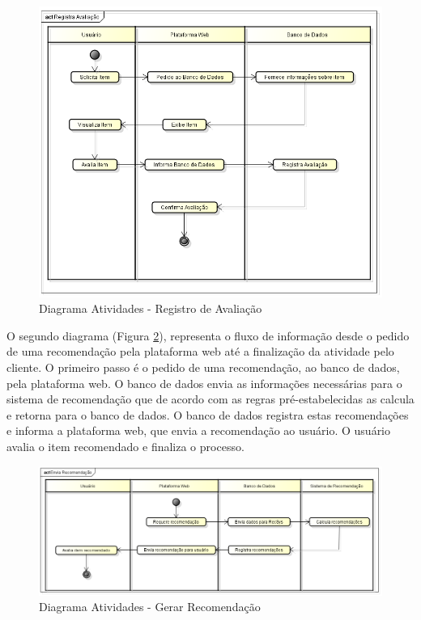 \begin{figure}[htp]
    \begin{center}
    \includegraphics[width=1\textwidth]{img/Atividade_Usuario}
    \end{center}
    \caption{Diagrama Atividades - Registro de Avaliação}
    \label{fig:Diagrama de Atividades - Registro de Avaliacao}
\end{figure}

O segundo diagrama (Figura \ref{fig:Diagrama de Atividades - Recomendacao}), representa o fluxo de informação desde o pedido de uma recomendação pela plataforma web até a finalização da atividade pelo cliente. O primeiro passo é o pedido de uma recomendação, ao banco de dados, pela plataforma web. O banco de dados envia as informações necessárias para o sistema de recomendação que de acordo com as regras pré-estabelecidas as calcula e retorna para o banco de dados. O banco de dados registra estas recomendações e informa a plataforma web, que envia a recomendação ao usuário. O usuário avalia o item recomendado e finaliza o processo. 


 \begin{figure}[htp]
    \begin{center}
    \includegraphics[width=1\textwidth]{img/Atividade_Recomendacao}
    \end{center}
    \caption{Diagrama Atividades - Gerar Recomendação}
    \label{fig:Diagrama de Atividades - Recomendacao}
\end{figure}